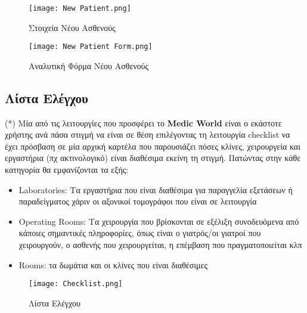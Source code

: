 \documentclass{article}
\begin{document}
\vspace{0.3cm}

\begin{figure}[!htb]
\centering
\texttt{[image: New Patient.png]}
\caption{\label{fig:new patient} Στοιχεία Νέου Ασθενούς }
\end{figure}

\newpage

\begin{figure}[!htb]
\centering
\texttt{[image: New Patient Form.png]}
\caption{\label{fig:new patient form} Αναλυτική Φόρμα Νέου Ασθενούς}
\end{figure}

\subsection{Λίστα Ελέγχου}

(*) Μία από τις λειτουργίες που προσφέρει το \textbf{Medic World} είναι ο εκάστοτε χρήστης ανά πάσα στιγμή να είναι σε θέση επιλέγοντας τη λειτουργία checklist να έχει πρόσβαση σε μία αρχική καρτέλα που παρουσιάζει πόσες κλίνες, χειρουργεία και εργαστήρια (πχ ακτινολογικό) είναι διαθέσιμα εκείνη τη στιγμή. Πατώντας στην κάθε κατηγορία θα εμφανίζονται τα εξής:

\begin{itemize}
  \item Laboratories: Τα εργαστήρια που είναι διαθέσιμα για παραγγελία εξετάσεων ή παραδείγματος χάριν οι αξονικοί τομογράφοι που είναι σε λειτουργία
  \item Operating Rooms: Τα χειρουργία που βρίσκονται σε εξέλιξη συνοδευόμενα από κάποιες σημαντικές πληροφορίες, όπως είναι ο γιατρός/οι γιατροί που χειρουργούν, ο ασθενής που χειρουργείται, η επέμβαση που πραγματοποιείται κλπ
  \item Rooms: τα δωμάτια και οι κλίνες που είναι διαθέσιμες
\end{itemize}

\vspace{0.3cm}

\begin{figure}[!htb]
\centering
\texttt{[image: Checklist.png]}
\caption{\label{fig:checklist} Λίστα Ελέγχου}
\end{figure}
\end{document}
